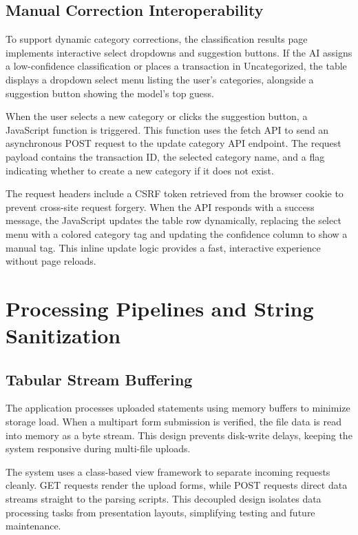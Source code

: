 \subsection{Manual Correction Interoperability}
To support dynamic category corrections, the classification results page implements interactive select dropdowns and suggestion buttons. If the AI assigns a low-confidence classification or places a transaction in Uncategorized, the table displays a dropdown select menu listing the user's categories, alongside a suggestion button showing the model's top guess.

When the user selects a new category or clicks the suggestion button, a JavaScript function is triggered. This function uses the fetch API to send an asynchronous POST request to the update category API endpoint. The request payload contains the transaction ID, the selected category name, and a flag indicating whether to create a new category if it does not exist.

The request headers include a CSRF token retrieved from the browser cookie to prevent cross-site request forgery. When the API responds with a success message, the JavaScript updates the table row dynamically, replacing the select menu with a colored category tag and updating the confidence column to show a manual tag. This inline update logic provides a fast, interactive experience without page reloads.

\section{Processing Pipelines and String Sanitization}

\subsection{Tabular Stream Buffering}
The application processes uploaded statements using memory buffers to minimize storage load. When a multipart form submission is verified, the file data is read into memory as a byte stream. This design prevents disk-write delays, keeping the system responsive during multi-file uploads.

The system uses a class-based view framework to separate incoming requests cleanly. GET requests render the upload forms, while POST requests direct data streams straight to the parsing scripts. This decoupled design isolates data processing tasks from presentation layouts, simplifying testing and future maintenance.

